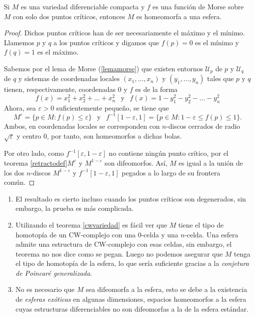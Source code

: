 \begin{theorem}
    Si $M$ es una variedad diferenciable compacta y $f$ es una función de Morse sobre $M$ con solo dos puntos críticos, entonces $M$ es homeomorfa a una esfera.
\end{theorem}
\begin{proof}
    Dichos puntos críticos han de ser necesariamente el máximo y el mínimo. Llamemos $p$ y $q$ a los puntos críticos y digamos que $f(p)=0$ es el mínimo y $f(q)=1$ es el máximo.

    Sabemos por el lema de Morse (\ref{lemamorse}) que existen entornos $\mathcal{U}_p$ de $p$ y $\mathcal{U}_q$ de $q$ y sistemas de coordenadas locales $(x_1,\dots,x_n)$ y $(y_1,\dots,y_n)$ tales que $p$ y $q$ tienen, respectivamente, coordenadas $0$ y $f$ es de la forma
    \begin{equation*}
        f(x) = x_1^2+x_2^2+\dots+x_n^2~~\text{ y }~~ f(x)=1-y_1^2- y_2^2-\dots-y_n^2
    \end{equation*}
    Ahora, sea $\varepsilon > 0$ suficientemente pequeño, se tiene que
    \begin{equation*}
        M^{\varepsilon} = \{p\in M \colon f(p)\le \varepsilon\} ~~\text{ y }~~ f^{-1}[1-\varepsilon,1] = \{p\in M \colon 1-\varepsilon \le f(p)\le 1\}.
    \end{equation*}
    Ambos, en coordenadas locales se corresponden con $n$-discos cerrados de radio $\sqrt{\varepsilon}$ y centro $0$, por tanto, son homeomorfos a dichas bolas.

    Por otro lado, como $f^{-1}[\varepsilon, 1-\varepsilon]$ no contiene ningún punto crítico, por el teorema \ref{retractodef}$M^{\varepsilon}$ y $M^{1-\varepsilon}$ son difeomorfos. Así, $M$ es igual a la unión de los dos $n$-discos $M^{1-\varepsilon}$ y $f^{-1}[1-\varepsilon,1]$ pegados a lo largo de su frontera común.
\end{proof}
\begin{remark}
    \begin{enumerate}[label=(\roman*)]
        \item El resultado es cierto incluso cuando los puntos críticos son degenerados, sin embargo, la prueba es más complicada.
        \item Utilizando el teorema \ref{cwvariedad} es fácil ver que $M$ tiene el tipo de homotopía de un CW-complejo con una $0$-celda y una $n$-celda. Una esfera admite una estructura de CW-complejo con esas celdas, sin embargo, el teorema no nos dice como se pegan. Luego no podemos asegurar que $M$ tenga el tipo de homotopía de la esfera, lo que sería suficiente gracias a la \textit{conjetura de Poincaré generalizada}.
        \item No es necesario que $M$ sea difeomorfa a la esfera, esto se debe a la existencia de \textit{esferas exóticas} en algunas dimensiones, espacios homeomorfos a la esfera cuyas estructuras diferenciables no son difeomorfas a la de la esfera estándar.
    \end{enumerate}
\end{remark}

